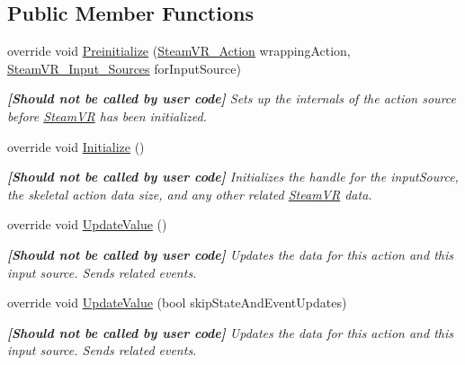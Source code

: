 \subsection*{Public Member Functions}
\begin{DoxyCompactItemize}
\item 
override void \mbox{\hyperlink{class_valve_1_1_v_r_1_1_steam_v_r___action___skeleton___source_a8341927740ab2699476e66d08d3124d3}{Preinitialize}} (\mbox{\hyperlink{class_valve_1_1_v_r_1_1_steam_v_r___action}{Steam\+V\+R\+\_\+\+Action}} wrapping\+Action, \mbox{\hyperlink{namespace_valve_1_1_v_r_a82e5bf501cc3aa155444ee3f0662853f}{Steam\+V\+R\+\_\+\+Input\+\_\+\+Sources}} for\+Input\+Source)
\begin{DoxyCompactList}\small\item\em {\bfseries{\mbox{[}Should not be called by user code\mbox{]}}} Sets up the internals of the action source before \mbox{\hyperlink{class_valve_1_1_v_r_1_1_steam_v_r}{Steam\+VR}} has been initialized. \end{DoxyCompactList}\item 
override void \mbox{\hyperlink{class_valve_1_1_v_r_1_1_steam_v_r___action___skeleton___source_af437a90257ecb494eb2c0b77747fe9d4}{Initialize}} ()
\begin{DoxyCompactList}\small\item\em {\bfseries{\mbox{[}Should not be called by user code\mbox{]}}} Initializes the handle for the input\+Source, the skeletal action data size, and any other related \mbox{\hyperlink{class_valve_1_1_v_r_1_1_steam_v_r}{Steam\+VR}} data. \end{DoxyCompactList}\item 
override void \mbox{\hyperlink{class_valve_1_1_v_r_1_1_steam_v_r___action___skeleton___source_ab6af87a8b749735903ba744c168f7baa}{Update\+Value}} ()
\begin{DoxyCompactList}\small\item\em {\bfseries{\mbox{[}Should not be called by user code\mbox{]}}} Updates the data for this action and this input source. Sends related events. \end{DoxyCompactList}\item 
override void \mbox{\hyperlink{class_valve_1_1_v_r_1_1_steam_v_r___action___skeleton___source_a1b70de6042eb094c05dcd7f905ff3abd}{Update\+Value}} (bool skip\+State\+And\+Event\+Updates)
\begin{DoxyCompactList}\small\item\em {\bfseries{\mbox{[}Should not be called by user code\mbox{]}}} Updates the data for this action and this input source. Sends related events. \end{DoxyCompactList}\item 

\end{DoxyCompactItemize}
